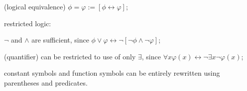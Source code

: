 \begin{definition}
\begin{legal}
\begin{legal}
      \item (logical equivalence)  $\phi = \varphi := [\phi \leftrightarrow \varphi]$;
      \end{legal} 
    \item restricted logic:
      \begin{legal}
        \item $\neg$ and $\land$ are sufficient, since $\phi \lor \varphi \leftrightarrow \neg[\neg \phi \land \neg \varphi]$;
        \item (quantifier) can be restricted to use of only $\exists$, since $\forall x \varphi(x) \leftrightarrow \neg \exists x \neg \varphi(x)$;
        \item constant symbols and function symbols can be entirely rewritten using parentheses and predicates.
      \end{legal}
  \end{legal}
  
\end{definition}

